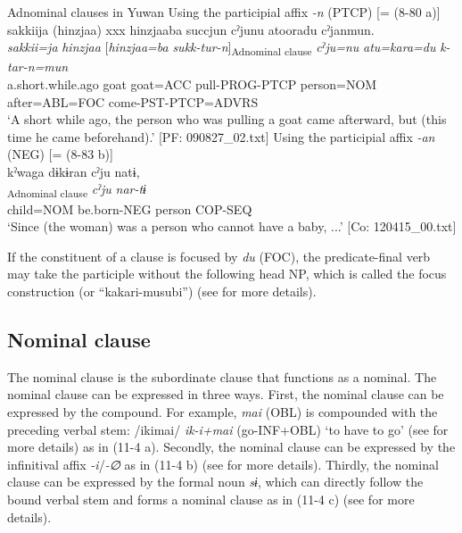 \ea\label{ex:11-3}  Adnominal clauses in Yuwan
  \ea Using the participial affix \textit{{}-n} (PTCP) [= (8-80 a)]\\
   \glll sakkiija  (hinzjaa)  xxx  hinzjaaba  succjun cˀjunu  atooradu  cˀjanmun.\\
    \textit{sakkii=ja}  \textit{hinzjaa}    [\textit{hinzjaa=ba}  \textit{sukk-tur-{n}}]\textsubscript{Adnominal clause}   \textit{cˀju=nu}  \textit{atu=kara=du}  \textit{k-tar-n=mun}\\
    a.short.while.ago  goat    goat=ACC  pull-PROG-PTCP  person=NOM  after=ABL=FOC  come-PST-PTCP=ADVRS\\
   \glt ‘A short while ago, the person who was pulling a goat came afterward, but (this time he came beforehand).’    [PF: 090827\_02.txt]
  \ex Using the participial affix \textit{{}-an} (NEG) [= (8-83 b)]\\
   \glll kˀwaga  dɨkɨran  cˀju  natɨ,\\
    [\textit{kˀwa=ga}  \textit{dɨkɨr-\Highlight{an}}]\textsubscript{Adnominal clause}  \textit{cˀju}  \textit{nar-tɨ}\\
    child=NOM  be.born-NEG  person  COP-SEQ\\
    ‘Since (the woman) was a person who cannot have a baby, ...’    [Co: 120415\_00.txt]
\z
\z

If the constituent of a clause is focused by \textit{du} (FOC), the predicate-final verb may take the participle without the following head NP, which is called the focus construction (or “kakari-musubi”) (see  for more details).

\subsection{Nominal clause}\label{sec:11.1.3}

The nominal clause is the subordinate clause that functions as a nominal. The nominal clause can be expressed in three ways. First, the nominal clause can be expressed by the compound. For example, \textit{mai} (OBL) is compounded with the preceding verbal stem: /ikimai/ \textit{ik-i+mai} (go-INF+OBL) ‘to have to go’ (see  for more details) as in (11-4 a). Secondly, the nominal clause can be expressed by the infinitival affix \textit{{}-i}/\textit{{}-∅} as in (11-4 b) (see  for more details). Thirdly, the nominal clause can be expressed by the formal noun \textit{sɨ}, which can directly follow the bound verbal stem and forms a nominal clause as in (11-4 c) (see  for more details).

